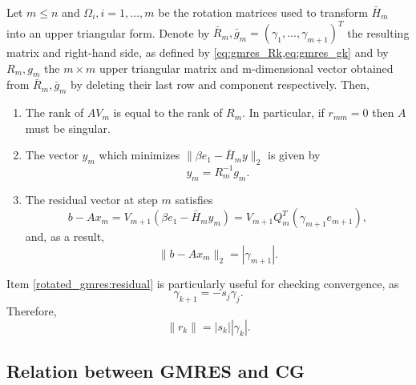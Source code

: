 \begin{theorem}
    Let $m \leq n$ and $\Omega_i, i=1, \ldots, m$ be the rotation matrices used to transform $\bar{H}_m$ into an upper triangular form. Denote by $\bar{R}_m, \bar{g}_m=\left(\gamma_1, \ldots, \gamma_{m+1}\right)^T$ the resulting matrix and right-hand side, as defined by \cref{eq:gmres_Rk,eq:gmres_gk} and by $R_m, g_m$ the $m \times m$ upper triangular matrix and m-dimensional vector obtained from $\bar{R}_m, \bar{g}_m$ by deleting their last row and component respectively. Then,
    \begin{enumerate} [label=\roman*, ref=rotated GMRES\roman*]
        \item\label{rotated_gmres:rank} The rank of $AV_m$ is equal to the rank of $R_m$. In particular, if $r_{m m} = 0$ then $A$ must be singular.
        \item\label{rotated_gmres:least_squares} The vector $y_m$ which minimizes $\|\beta e_1 - \bar{H}_m y\|_2$ is given by
              \[
                  y_m = R_m^{-1} g_m.
              \]
        \item\label{rotated_gmres:residual} The residual vector at step $m$ satisfies 
              \[
                  b - Ax_m = V_{m+1}(\beta e_1 - \bar{H}_m y_m) = V_{m+1}Q_m^T(\gamma_{m+1}e_{m+1}),
              \]
              and, as a result,
              \[
                  \|b - Ax_m\|_2 = |\gamma_{m+1}|.
              \]
    \end{enumerate}
\end{theorem}

Item \ref{rotated_gmres:residual} is particularly useful for checking convergence, as \cite[Equation 6.47]{iter_method_saad}
\[
    \gamma_{k+1} = -s_j\gamma_j.
\]
Therefore, 
\begin{equation}
    \|r_k\| = |s_k||\gamma_k|.
    \label{eq:gmres_residual}
\end{equation}

\subsection{Relation between GMRES and CG}
